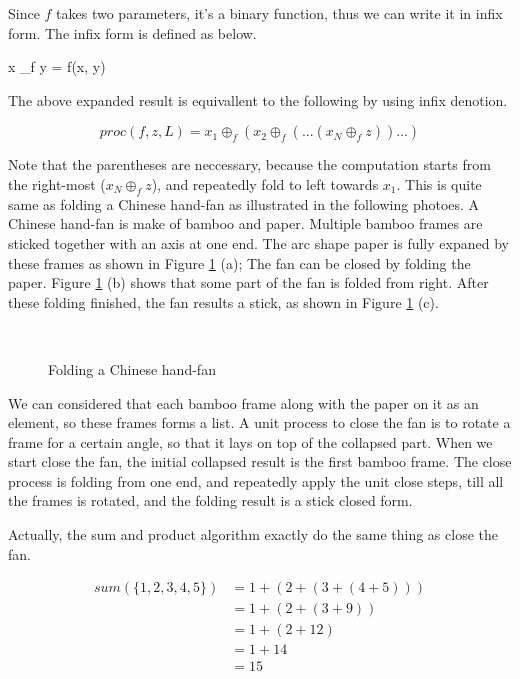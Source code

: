 \documentclass{article}
\begin{document}
Since $f$ takes two parameters, it's a binary function, thus we can write it in infix form. The infix
form is defined as below.

\be
x \oplus_f y = f(x, y)
\ee

The above expanded result is equivallent to the following by using infix denotion.

\[
proc(f, z, L) = x_1 \oplus_f (x_2 \oplus_f (... (x_N \oplus_f z))...)
\]

Note that the parentheses are neccessary, because the computation starts from the right-most ($x_N \oplus_f z$),
and repeatedly fold to left towards $x_1$. This is quite same as folding a Chinese hand-fan as illustrated
in the following photoes. A Chinese hand-fan is make of bamboo and paper. Multiple bamboo frames are sticked
together with an axis at one end. The arc shape paper is fully expaned by these frames as shown in Figure 
\ref{fig:fold-fan} (a);
The fan can be closed by folding the paper. Figure \ref{fig:fold-fan} (b) shows that some part of the fan
is folded from right. After these folding finished, the fan results a stick, as shown in Figure \ref{fig:fold-fan} (c).

\begin{figure}[htbp]
    \centering
     \\
    \caption{Folding a Chinese hand-fan} \label{fig:fold-fan}
\end{figure}

We can considered that each bamboo frame along with the paper on it as an element, so these frames forms a
list. A unit process to close the fan is to rotate a frame for a certain angle, so that it lays on top
of the collapsed part. When we start close the fan, the initial collapsed result is the first bamboo frame.
The close process is folding from one end, and repeatedly apply the unit close steps, till all the frames
is rotated, and the folding result is a stick closed form.

Actually, the sum and product algorithm exactly do the same thing as close the fan.

\[
\begin{array}{rl}
sum(\{1, 2, 3, 4, 5 \}) & = 1 + (2 + (3 + (4 + 5))) \\
         & = 1 + (2 + (3 + 9)) \\
         & = 1 + (2 + 12) \\
         & = 1 + 14 \\
         & = 15
\end{array}
\]
\end{document}
